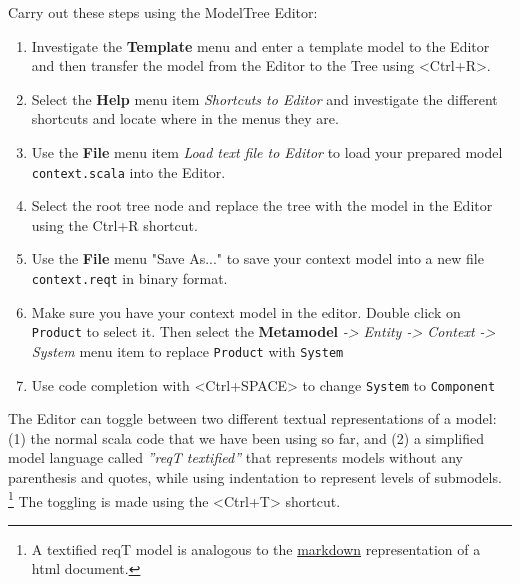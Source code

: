 \documentclass[11pt]{article}
\begin{document}
\begin{framed}
Carry out these steps using the ModelTree Editor:
\begin{enumerate}
\item Investigate the {\bf Template} menu and enter a template model to the Editor and then transfer the model from the Editor to the Tree using <Ctrl+R>.
\item Select the {\bf Help} menu item {\it Shortcuts to Editor} and investigate the different shortcuts and locate where in the menus they are. 
\item Use the {\bf File} menu item {\it Load text file to Editor} to load your prepared model \verb+context.scala+ into the Editor.
\item Select the root tree node and replace the tree with the model in the Editor using the Ctrl+R shortcut.
\item Use the {\bf File} menu "Save As..." to save your context model into a new file \verb+context.reqt+ in binary format.
\item Make sure you have your context model in the editor. Double click on \verb+Product+ to select it. Then select the {\bf Metamodel} {\it -> Entity -> Context -> System} menu item to replace \verb+Product+ with \verb+System+
\item Use code completion with <Ctrl+SPACE> to change \verb+System+ to \verb+Component+ 
\end{enumerate}
\end{framed}

The Editor can toggle between two different textual representations of a model: (1) the normal scala code that we have been using so far, and (2) a simplified model language called {\it ''reqT textified''} that represents models without any parenthesis and quotes, while using indentation to represent levels of submodels. \footnote{A textified reqT model is analogous to the \href{http://en.wikipedia.org/wiki/Markdown}{markdown} representation of a html document.} The toggling is made using the <Ctrl+T> shortcut.
\end{document}
